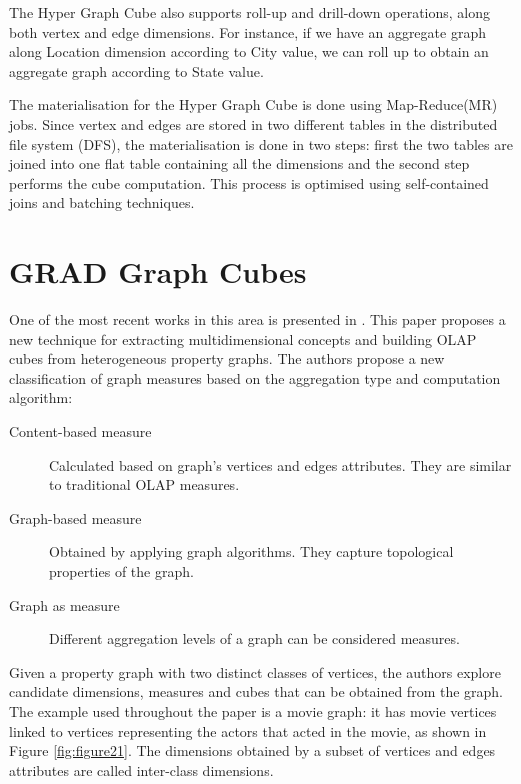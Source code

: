 The Hyper Graph Cube also supports roll-up and drill-down operations, along both vertex and edge dimensions. For instance, if we have an aggregate graph along Location dimension according to City value, we can roll up to obtain an aggregate graph according to State value.
 
The materialisation for the Hyper Graph Cube is done using Map-Reduce(MR) jobs. Since vertex and edges are stored in two different tables in the distributed file system (DFS), the materialisation is done in two steps: first the two tables are joined into one flat table containing all the dimensions and the second step performs the cube computation. This process is optimised using self-contained joins and batching techniques.

\section{GRAD Graph Cubes}

One of the most recent works in this area is presented in \cite{ghrab2015framework}. This paper proposes a new technique for extracting multidimensional concepts and building OLAP cubes from heterogeneous property graphs. The authors propose a new classification of graph measures based on the aggregation type and computation algorithm:
\begin{description}
\item[Content-based measure] Calculated based on graph's vertices and edges attributes. They are similar to traditional OLAP measures.
\item[Graph-based measure] Obtained by applying graph algorithms. They capture topological properties of the graph.
\item[Graph as measure] Different aggregation levels of a graph can be considered measures.
\end{description}

Given a property graph with two distinct classes of vertices, the authors explore candidate dimensions, measures and cubes that can be obtained from the graph. The example used throughout the paper is a movie graph: it has movie vertices linked to vertices representing the actors that acted in the movie, as shown in Figure \ref{fig:figure21}. The dimensions obtained by a subset of vertices and edges attributes are called inter-class dimensions.

